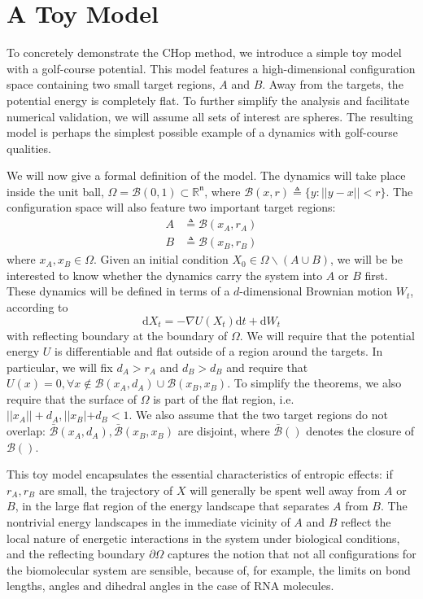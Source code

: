 \documentclass[english, aip, jcp, priprint, graphicx,floatfix]{revtex4-1}
\theoremstyle{plain}
\theoremstyle{definition}
\theoremstyle{plain}
\newcommand{\dimension}{{\mathfrak{n}}}
\newcommand{\bb}[1]{\mathcal{B}\left(#1\right)}
\newcommand{\BB}[1]{\mathcal{\bar B}\left(#1\right)}
\begin{document}
\section{A Toy Model}\label{sec:toy_model}

To concretely demonstrate the CHop method, we introduce a simple toy model with a golf-course potential.  This model features a high-dimensional configuration space containing two small target regions, $A$ and $B$.  Away from the targets, the potential energy is completely flat.  To further simplify the analysis and facilitate numerical validation, we will assume all sets of interest are spheres.  The resulting model is perhaps the simplest possible example of a dynamics with golf-course qualities.  

We will now give a formal definition of the model.  The dynamics will take place inside the unit ball, $\Omega = \bb{0,1}\subset \mathbb{R}^\dimension$, where $\bb{x, r} \triangleq \{ y : || y - x || < r \}$.  The configuration space will also feature two important target regions:
\begin{align*}
A &\triangleq \bb {x_A, r_A}\\
B &\triangleq \bb {x_B, r_B}
\end{align*}
where $x_A,x_B \in \Omega$.  Given an initial condition $X_0\in \Omega \backslash (A\cup B)$, we will be be interested to know whether the dynamics carry the system into $A$ or $B$ first.  These dynamics will be defined in terms of a $d$-dimensional Brownian motion $W_t$, according to 
\begin{equation} \label{equ:toy_sde}
\mathrm{d} X_t = - \nabla U (X_t) \mathrm{d} t + \mathrm{d} W_t 
\end{equation}
with reflecting boundary at the boundary of $\Omega$.  We will require that the potential energy $U$ is differentiable and flat outside of a region around the targets.  In particular, we will fix $d_A>r_A$ and $d_B>d_B$ and require that $U (x) = 0, \forall x \not\in \bb{x_A,d_A} \cup \bb{x_B,x_B}$.  To simplify the theorems, we also require that the surface of $\Omega$ is part of the flat region, i.e. $||x_A||+d_A,||x_B|+d_B<1$.  We also assume that the two target regions do not overlap: $\BB{x_A,d_A},\BB{x_B,x_B}$ are disjoint, where $\BB{}$ denotes the closure of $\bb{}$.  

This toy model encapsulates the essential characteristics of entropic effects: if $r_A, r_B$ are small, the trajectory of $X$ will generally be spent well away from $A$ or $B$, in the large flat region of the energy landscape that separates $A$ from $B$. The nontrivial energy landscapes in the immediate vicinity of $A$ and $B$ reflect the local nature of energetic interactions in the system under biological conditions, and the reflecting boundary $\partial\Omega$ captures the notion that not all configurations for the biomolecular system are sensible, because of, for example, the limits on bond lengths, angles and dihedral angles in the case of RNA molecules.
\end{document}
